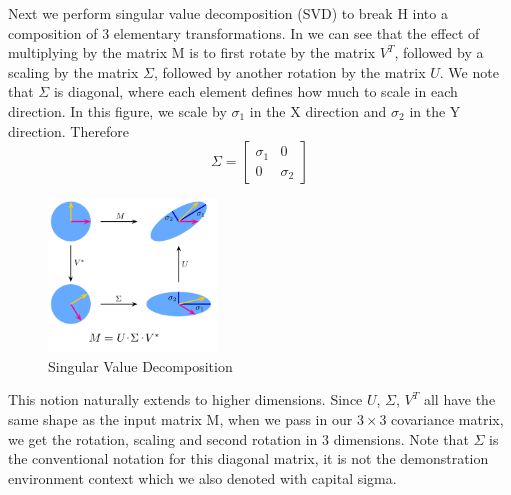 Next we perform singular value decomposition (SVD) to break H into a composition of 3 elementary transformations. In  we can see that the effect of multiplying by the matrix M is to first rotate by the matrix $V^T$, followed by a scaling by the matrix $\Sigma$, followed by another rotation by the matrix $U$. We note that $\Sigma$ is diagonal, where each element defines how much to scale in each direction. In this figure, we scale by $\sigma_1$ in the X direction and $\sigma_2$ in the Y direction. Therefore
$$\Sigma = \begin{bmatrix}
  \sigma_1 & 0\\
  0 & \sigma_2
\end{bmatrix} $$

\begin{figure}[h]
    \centering
    \includegraphics[width=0.4\textwidth]{figures/SVD-img.png}
    \caption{Singular Value Decomposition \cite{SVD-img}}
    \label{fig:svd}
\end{figure}


This notion naturally extends to higher dimensions. Since $U$, $\Sigma$, $V^T$ all have the same shape as the input matrix M, when we pass in our $3 \times 3$ covariance matrix, we get the rotation, scaling and second rotation in 3 dimensions. Note that $\Sigma$ is the conventional notation for this diagonal matrix, it is not the demonstration environment context which we also denoted with capital sigma.\\

